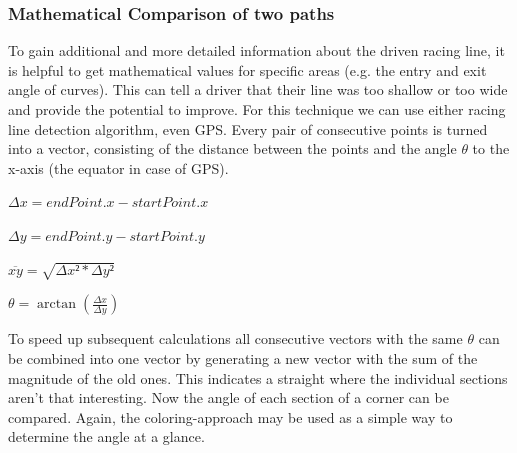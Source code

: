 \subsubsection{Mathematical Comparison of two paths}
To gain additional and more detailed information about the driven racing line, it is helpful to get mathematical values for specific areas (e.g. the entry and exit angle of curves). This can tell a driver that their line was too shallow or too wide and provide the potential to improve.
For this technique we can use either racing line detection algorithm, even GPS. Every pair of consecutive points is turned into a vector, consisting of the distance between the points and the angle $\theta$ to the x-axis (the equator in case of GPS).

\begin{minipage}{\textwidth}
\begin{center}
$\Delta x = endPoint.x - startPoint.x$

$\Delta y = endPoint.y - startPoint.y$

$\overline{xy} = \sqrt{\Delta x² * \Delta y²}$

$\theta = \arctan(\frac{\Delta x}{\Delta y})$ 
\end{center}
\end{minipage}

To speed up subsequent calculations all consecutive vectors with the same $\theta$ can be combined into one vector by generating a new vector with the sum of the magnitude of the old ones. This indicates a straight where the individual sections aren't that interesting.
Now the angle of each section of a corner can be compared. Again, the coloring-approach may be used as a simple way to determine the angle at a glance.
\clearpage
